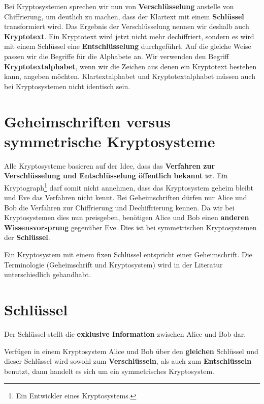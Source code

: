 Bei Kryptosystemen sprechen wir nun von \textbf{Verschlüsselung} anstelle von Chiffrierung, um deutlich zu machen, dass der Klartext mit einem \textbf{Schlüssel} transformiert wird. Das Ergebnis der Verschlüsselung nennen wir deshalb auch \textbf{Kryptotext}. Ein Kryptotext wird jetzt nicht mehr dechiffriert, sondern es wird mit einem Schlüssel eine \textbf{Entschlüsselung} durchgeführt. Auf die gleiche Weise passen wir die Begriffe für die Alphabete an. Wir verwenden den Begriff \textbf{Kryptotextalphabet}, wenn wir die Zeichen aus denen ein Kryptotext bestehen kann, angeben möchten. Klartextalphabet und Kryptotextalphabet müssen auch bei Kryptosystemen nicht identisch sein.

\section{Geheimschriften versus symmetrische Kryptosysteme}

Alle Kryptosysteme basieren auf der Idee, dass das \textbf{Verfahren zur Verschlüsselung und Entschlüsselung öffentlich bekannt} ist. Ein Kryptograph\footnote{Ein Entwickler eines Kryptosystems.} darf somit nicht annehmen, dass das Kryptosystem geheim bleibt und Eve das Verfahren nicht kennt. Bei Geheimschriften dürfen nur Alice und Bob die Verfahren zur Chiffrierung und Dechiffrierung kennen. Da wir bei Kryptosystemen dies nun preisgeben, benötigen Alice und Bob einen \textbf{anderen Wissensvorsprung} gegenüber Eve. Dies ist bei symmetrischen Kryptosystemen der \textbf{Schlüssel}.

\begin{hinweis}
	Ein Kryptosystem mit einem fixen Schlüssel entspricht einer Geheimschrift. Die Terminologie (Geheimschrift und Kryptosystem) wird in der Literatur unterschiedlich gehandhabt.
\end{hinweis}

\section{Schlüssel}

Der Schlüssel stellt die \textbf{exklusive Information} zwischen Alice und Bob dar.

\begin{definition}
	Verfügen in einem Kryptosystem Alice und Bob über den \textbf{gleichen} Schlüssel und dieser Schlüssel wird sowohl zum \textbf{Verschlüsseln}, als auch zum \textbf{Entschlüsseln} benutzt, dann handelt es sich um ein symmetrisches Kryptosystem.
\end{definition}

